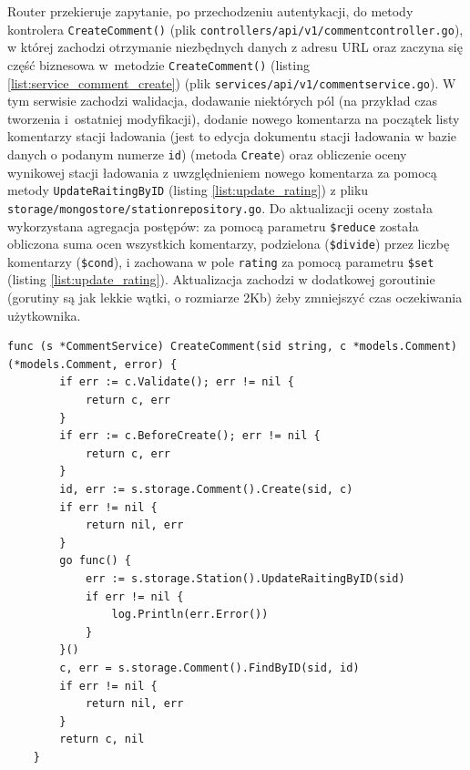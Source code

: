 Router przekieruje zapytanie, po przechodzeniu autentykacji, do metody kontrolera \texttt{CreateComment()} (plik \texttt{controllers/api/v1/commentcontroller.go}), w której zachodzi otrzymanie niezbędnych danych z adresu URL oraz zaczyna się część biznesowa w~metodzie \texttt{CreateComment()} (listing \ref{list:service_comment_create}) (plik \texttt{services/api/v1/commentservice.go}).
W tym serwisie zachodzi walidacja, dodawanie niektórych pól (na przykład czas tworzenia i~ostatniej modyfikacji), dodanie nowego komentarza na początek listy komentarzy stacji ładowania (jest to edycja dokumentu stacji ładowania w bazie danych o podanym numerze \texttt{id}) (metoda \texttt{Create}) oraz obliczenie oceny wynikowej stacji ładowania z uwzględnieniem nowego komentarza za pomocą metody \texttt{UpdateRaitingByID} (listing \ref{list:update_rating}) z pliku \texttt{storage/mongostore/stationrepository.go}.
Do aktualizacji oceny została wykorzystana agregacja postępów: za pomocą parametru \texttt{\$reduce} została obliczona suma ocen wszystkich komentarzy, podzielona (\texttt{\$divide}) przez liczbę komentarzy (\texttt{\$cond}), i zachowana w pole \texttt{rating} za pomocą parametru \texttt{\$set} (listing \ref{list:update_rating}). Aktualizacja zachodzi w dodatkowej goroutinie (gorutiny są jak lekkie wątki, o rozmiarze 2Kb) żeby zmniejszyć czas oczekiwania użytkownika.


\begin{lstlisting}[label=list:service_comment_create,caption=Serwis tworzenia komentarza,basicstyle=\tiny\ttfamily]
    func (s *CommentService) CreateComment(sid string, c *models.Comment) (*models.Comment, error) {
        if err := c.Validate(); err != nil {
            return c, err
        }
        if err := c.BeforeCreate(); err != nil {
            return c, err
        }
        id, err := s.storage.Comment().Create(sid, c)
        if err != nil {
            return nil, err
        }
        go func() {
            err := s.storage.Station().UpdateRaitingByID(sid)
            if err != nil {
                log.Println(err.Error())
            }
        }()
        c, err = s.storage.Comment().FindByID(sid, id)
        if err != nil {
            return nil, err
        }
        return c, nil
    }
\end{lstlisting}
    
